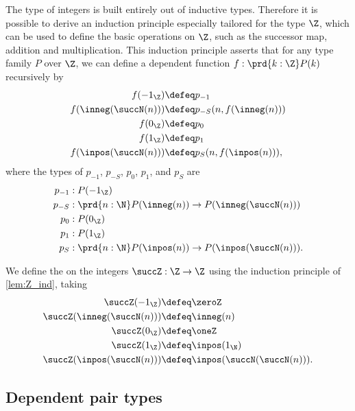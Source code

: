 \begin{rmk}\label{lem:Z_ind}
  The type of integers is built entirely out of inductive types. Therefore it is possible to derive an induction principle especially tailored for the type $\Z$, which can be used to define the basic operations on $\Z$, such as the successor map, addition and multiplication. This induction principle asserts that for any type family $P$ over $\Z$,  we can define a dependent function $f:\prd{k:\Z}P(k)$ recursively by
  \begin{align*}
    f(-1_\Z) & \defeq p_{-1} \\*
    f(\inneg(\succN(n))) & \defeq p_{-S}(n,f(\inneg(n))) \\*
    f(0_\Z) & \defeq p_{0} \\*
    f(1_\Z) & \defeq p_{1} \\*
    f(\inpos(\succN(n))) & \defeq p_S(n,f(\inpos(n))),
  \end{align*}
  where the types of $p_{-1}$, $p_{-S}$, $p_0$, $p_1$, and $p_S$ are 
  \begin{align*}
    p_{-1} & :P(-1_\Z) \\*
    p_{-S} & : \prd{n:\N}P(\inneg(n))\to P(\inneg(\succN(n)))\\*
    p_{0} & : P(0_\Z) \\*
    p_{1} & : P(1_\Z) \\*
    p_{S} & : \prd{n:\N}P(\inpos(n))\to P(\inpos(\succN(n))).
  \end{align*}
\end{rmk}

\begin{defn}
We define the  on the integers $\succZ:\Z\to\Z$ using the induction principle of \cref{lem:Z_ind}, taking
\begin{align*}
\succZ(-1_\Z) & \defeq \zeroZ \\*
\succZ(\inneg(\succN(n))) & \defeq \inneg(n) \\*
\succZ(0_\Z) & \defeq \oneZ \\*
\succZ(1_\Z) & \defeq \inpos(1_\N) \\*
\succZ(\inpos(\succN(n))) & \defeq \inpos(\succN(\succN(n))).
\end{align*}
\end{defn}

\subsection{Dependent pair types}

